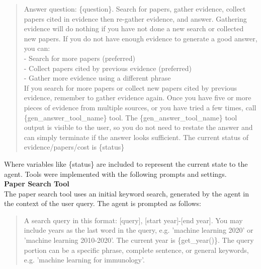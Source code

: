 \documentclass{article}
\begin{document}
\begin{quote}
Answer question: \{question\}. Search for papers, gather evidence, collect papers cited in evidence then re-gather evidence, and answer. Gathering evidence will do nothing if you have not done a new search or collected new papers. If you do not have enough evidence to generate a good answer, you can:
\\
- Search for more papers (preferred)\\
- Collect papers cited by previous evidence (preferred)\\
- Gather more evidence using a different phrase\\

If you search for more papers or collect new papers cited by previous evidence, remember to gather evidence again. Once you have five or more pieces of evidence from multiple sources, or you have tried a few times, call \{gen\_answer\_tool\_name\} tool. The \{gen\_answer\_tool\_name\} tool output is visible to the user, so you do not need to restate the answer and can simply terminate if the answer looks sufficient. The current status of evidence/papers/cost is \{status\}
\end{quote}

Where variables like \{status\} are included to represent the current state to the agent. Tools were implemented with the following prompts and settings. \\

\textbf{Paper Search Tool} \\

The paper search tool uses an initial keyword search, generated by the agent in the context of the user query. The agent is prompted as follows: 

\begin{quote}
A search query in this format: [query], [start year]-[end year]. You may include years as the last word in the query, e.g. 'machine learning 2020' or 'machine learning 2010-2020'. The current year is \{get\_year()\}. The query portion can be a specific phrase, complete sentence, or general keywords, e.g. 'machine learning for immunology'.
\end{quote}
\end{document}
